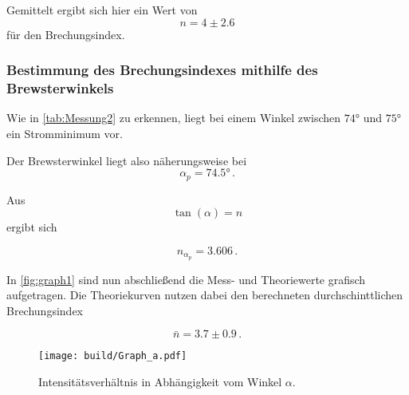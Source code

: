 Gemittelt ergibt sich hier ein Wert von
\begin{equation*}
    n = 4 \pm 2.6
\end{equation*}
für den Brechungsindex.

\subsubsection{Bestimmung des Brechungsindexes mithilfe des Brewsterwinkels}

Wie in \autoref{tab:Messung2} zu erkennen, liegt bei einem Winkel zwischen $74°$ und $75°$ ein Stromminimum vor.

Der Brewsterwinkel liegt also näherungsweise bei
\begin{equation*}
    \alpha_p = 74.5 ° \,.
\end{equation*}

Aus
\begin{equation*}
    \tan(\alpha) = n 
\end{equation*}
ergibt sich

\begin{equation*}
    n_{\alpha_p} = 3.606 \,.
\end{equation*}

In \autoref{fig:graph1} sind nun abschließend die Mess- und Theoriewerte grafisch aufgetragen. Die Theoriekurven nutzen dabei den berechneten durchschinttlichen Brechungsindex

\begin{equation*}
    \bar{n} = 3.7 \pm 0.9 \,.
\end{equation*}

\begin{figure}
    \centering
    \texttt{[image: build/Graph\_a.pdf]}
    \caption{Intensitätsverhältnis in Abhängigkeit vom Winkel $\alpha$.}
    \label{fig:graph1}
\end{figure}

